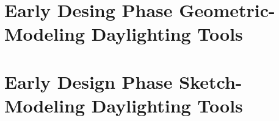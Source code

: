 \section{Early Desing Phase Geometric-Modeling Daylighting Tools}

\section{Early Design Phase Sketch-Modeling Daylighting Tools}
